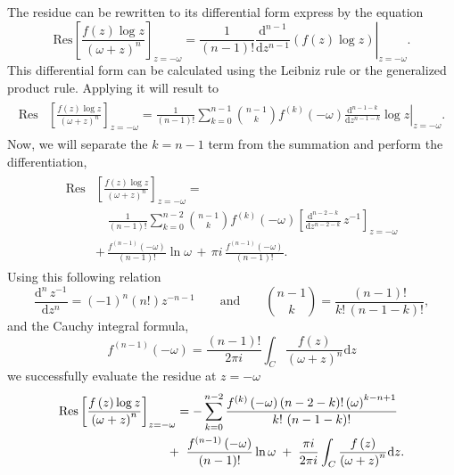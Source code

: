 The residue can be rewritten to its differential form express by the equation
\begin{equation}
	\mathrm{Res}\left[\frac{f\left(z\right)\log z}{\left(\omega+z\right)^n}\right]_{z=-\omega}= \left. \frac{1}{\left(n-1\right)!}\frac{\mathrm{d}^{n-1}}{\mathrm{d}z^{n-1}}\left(f\left(z\right)\log z\right)\right|_{z=-\omega}.
\end{equation}
This differential form can be calculated using the Leibniz rule or the generalized product rule. Applying it will result to
\begin{align}
\begin{split}
		\mathrm{Res}&\left[\frac{f\left(z\right)\log z}{\left(\omega+z\right)^n}\right]_{z=-\omega}  = \frac{1}{\left(n-1\right)!}\sum_{k=0}^{n-1}{n-1\choose k}f^{\left(k\right)}\left(-\omega\right)\left. \frac{\mathrm{d}^{n-1-k}}{\mathrm{d}z^{n-1-k}}\log z\right|_{z=-\omega}.
\end{split}
\end{align}
Now, we will separate the $k=n-1$ term from the summation and perform the differentiation,
\begin{align}
\begin{split}
		\mathrm{Res}&\left[\frac{f\left(z\right)\log z}{\left(\omega+z\right)^n}\right]_{z=-\omega}  = \\& \quad \frac{1}{\left(n-1\right)!}\sum_{k=0}^{n-2}{n-1\choose k}f^{\left(k\right)}\left(-\omega\right)\left[\frac{\mathrm{d}^{n-2-k}}{\mathrm{d}z^{n-2-k}}\,z^{-1} \right]_{z=-\omega} \\&
		 +\, \frac{f^{\left(n-1\right)}\left(-\omega\right)}{\left(n-1\right)!}\ln \omega\, +\, \pi i\,\frac{f^{\left(n-1\right)}\left(-\omega\right)}{\left(n-1\right)!}.
\end{split}
\end{align}
Using this following relation
\begin{equation}
	\frac{\mathrm{d}^{n}\,z^{-1}}{\mathrm{d}z^{n}}=\left(-1\right)^{n}\left(n!\right)z^{-n-1}\qquad\text{and}\qquad{n-1\choose k}=\frac{\left(n-1\right)!}{k!\,\left(n-1-k\right)!},
\end{equation}
and the Cauchy integral formula,
\begin{equation}
	f^{\left(n-1\right)}\left(-\omega\right)=\frac{\left(n-1\right)!}{2\pi i}\int_{C}\frac{f\left(z\right)}{\left(\omega+z\right)^n}\mathrm{d}z
\end{equation}
we successfully evaluate the residue at $z = -\omega$
\begin{align}
\begin{split}\label{esd}
	\mathrm{Res}&\left[\frac{f\left(z\right)\log z}{\left(\omega+z\right)^n}\right]_{z=-\omega}  = -\sum_{k=0}^{n-2}\frac{f^{\left(k\right)}\left(-\omega\right)\left(n-2-k\right)!\left(\omega\right)^{k-n+1}}{k!\,\left(n-1-k\right)!} \\& \hspace{25mm}
	 +\,\,\frac{f^{\left(n-1\right)}\left(-\omega\right)}{\left(n-1\right)!}\ln\omega\;+\;\frac{\pi i}{2\pi i}\int_{C}\frac{f\left(z\right)}{\left(\omega+z\right)^n}\mathrm{d}z.
\end{split}
\end{align}

